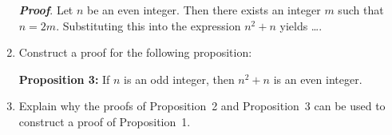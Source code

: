 \begin{previewactivity}
\begin{enumerate}
\textbf{\emph{Proof}}.  Let  $n$  be an even integer.  Then there exists an integer  $m$  such that $n = 2m$.  Substituting this into the expression  $n^2  + n$ yields \ldots .

\item Construct a proof for the following proposition:

\textbf{Proposition 3:}  If  $n$  is an odd integer, then  $n^2  + n$ is an even integer.

\item Explain why the proofs of Proposition~2 and Proposition~3 can be used to construct a proof of Proposition~1.
\end{enumerate}

\end{previewactivity}
\hbreak

\endinput
